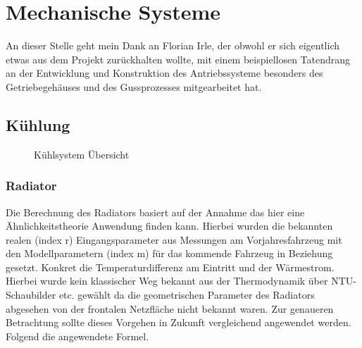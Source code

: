 
\chapter{Mechanische Systeme}
An dieser Stelle geht mein Dank an Florian Irle, der obwohl er sich eigentlich etwas aus dem Projekt zurückhalten wollte, mit einem beispiellosen Tatendrang an der Entwicklung und Konstruktion des Antriebssysteme besonders des Getriebegehäuses und des Gussprozesses mitgearbeitet hat.

%
%
%


\section{Kühlung}

\begin{figure}[H]
	\centering
	
	\caption{Kühlsystem Übersicht}
	\label{abb:Coolingssystem}
\end{figure}

\FloatBarrier
\subsection{Radiator}
Die Berechnung des Radiators basiert auf der Annahme das hier eine Ähnlichkeitstheorie Anwendung finden kann. Hierbei wurden die bekannten realen (index r) Eingangsparameter aus Messungen am Vorjahresfahrzeug mit den Modellparametern (index m) für das kommende Fahrzeug in Beziehung gesetzt. Konkret die Temperaturdifferenz am Eintritt und der Wärmestrom. Hierbei wurde kein klassischer Weg bekannt aus der Thermodynamik über NTU-Schaubilder etc. gewählt da die geometrischen Parameter des Radiators abgesehen von der frontalen Netzfläche nicht bekannt waren. Zur genaueren Betrachtung sollte dieses Vorgehen in Zukunft vergleichend angewendet werden. Folgend die angewendete Formel.

